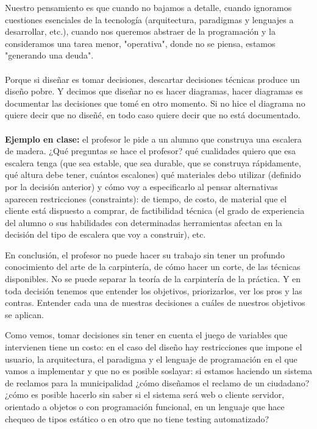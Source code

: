 \documentclass[12pt]{book}
\begin{document}
Nuestro pensamiento es que cuando no bajamos a detalle, cuando ignoramos cuestiones esenciales de la tecnología (arquitectura, paradigmas y lenguajes a desarrollar, etc.), cuando nos queremos abstraer de la programación y la consideramos una tarea menor, "operativa", donde no se piensa, estamos "generando una deuda".
\\
\\
Porque si diseñar es tomar decisiones, descartar decisiones técnicas produce un diseño pobre. Y decimos que diseñar no es hacer diagramas, hacer diagramas es documentar las decisiones que tomé en otro momento. Si no hice el diagrama no quiere decir que no diseñé, en todo caso quiere decir que no está documentado.
\\
\\
\textbf{Ejemplo en clase:} el profesor le pide a un alumno que construya una escalera de madera. ¿Qué preguntas se hace el profesor?
qué cualidades quiero que esa escalera tenga (que sea estable, que sea durable, que se construya rápidamente, qué altura debe tener, cuántos escalones)
qué materiales debo utilizar (definido por la decisión anterior) y cómo voy a especificarlo
al pensar alternativas aparecen restricciones (constraints): de tiempo, de costo, de material que el cliente está dispuesto a comprar, de factibilidad técnica (el grado de experiencia del alumno o sus habilidades con determinadas herramientas afectan en la decisión del tipo de escalera que voy a construir), etc.

En conclusión, el profesor no puede hacer su trabajo sin tener un profundo conocimiento del arte de la carpintería, de cómo hacer un corte, de las técnicas disponibles. No se puede separar la teoría de la carpintería de la práctica. Y en toda decisión tenemos que entender los objetivos, priorizarlos, ver los pros y las contras. Entender cada una de nuestras decisiones a cuáles de nuestros objetivos se aplican.

Como vemos, tomar decisiones sin tener en cuenta el juego de variables que intervienen tiene un costo: en el caso del diseño hay restricciones que impone el usuario, la arquitectura, el paradigma y el lenguaje de programación en el que vamos a implementar y que no es posible soslayar: si estamos haciendo un sistema de reclamos para la municipalidad ¿cómo diseñamos el reclamo de un ciudadano? ¿cómo es posible hacerlo sin saber si el sistema será web o cliente servidor, orientado a objetos o con programación funcional, en un lenguaje que hace chequeo de tipos estático o en otro que no tiene testing automatizado?
\end{document}
